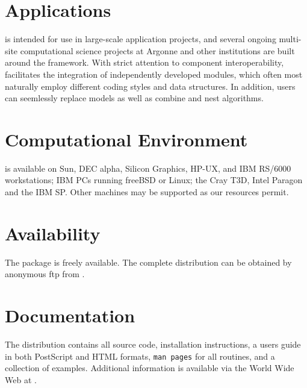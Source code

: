 \section*{Applications}
 is intended for use in large-scale application projects, and
several ongoing multi-site computational science projects at Argonne and
other institutions are built around the  framework.
With strict attention to component interoperability, 
facilitates the integration of independently developed modules, which
often most naturally employ different coding styles and data
structures.  In addition, users can seemlessly replace models as well
as combine and nest algorithms.

\section*{Computational Environment}
 is available on Sun, DEC alpha, Silicon Graphics, HP-UX, and IBM
RS/6000 workstations; IBM PCs running freeBSD or Linux; the Cray T3D,
Intel Paragon and the IBM SP. Other machines may be supported as our
resources permit.

\section*{Availability}

The  package is freely available.
The complete distribution can be obtained by anonymous ftp from 
.

\section*{Documentation}

The  distribution contains all source code, 
installation instructions,
a users guide in both PostScript and HTML formats, 
{\tt man pages} for all routines,
and a collection of examples.
Additional information is available via the World Wide Web at
.
\makeinfo

